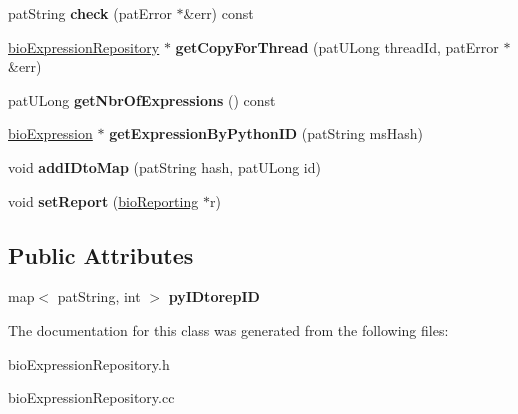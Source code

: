 \begin{DoxyCompactItemize}
\mbox{\label{classbio_expression_repository_a1c42b3fede9b8a0060b8f7e69d34237e}} 
pat\+String {\bfseries check} (pat\+Error $\ast$\&err) const
\item 
\mbox{\label{classbio_expression_repository_aeb8fb9e00af8900243d1b8024b8917ee}} 
\hyperlink{classbio_expression_repository}{bio\+Expression\+Repository} $\ast$ {\bfseries get\+Copy\+For\+Thread} (pat\+U\+Long thread\+Id, pat\+Error $\ast$\&err)
\item 
\mbox{\label{classbio_expression_repository_ae1739e45cec8eb48825e8cea42edcb83}} 
pat\+U\+Long {\bfseries get\+Nbr\+Of\+Expressions} () const
\item 
\mbox{\label{classbio_expression_repository_a857fe180f7655b1a872dab14ff0cf37c}} 
\hyperlink{classbio_expression}{bio\+Expression} $\ast$ {\bfseries get\+Expression\+By\+Python\+ID} (pat\+String ms\+Hash)
\item 
\mbox{\label{classbio_expression_repository_a4281f026125954231724c289e387d725}} 
void {\bfseries add\+I\+Dto\+Map} (pat\+String hash, pat\+U\+Long id)
\item 
\mbox{\label{classbio_expression_repository_a0bdf21c8462e0a24db625149e57dc323}} 
void {\bfseries set\+Report} (\hyperlink{classbio_reporting}{bio\+Reporting} $\ast$r)
\end{DoxyCompactItemize}
\subsection*{Public Attributes}
\begin{DoxyCompactItemize}
\item 
\mbox{\label{classbio_expression_repository_a8cdbf5267f566db1ee5ba8a065f236cd}} 
map$<$ pat\+String, int $>$ {\bfseries py\+I\+Dtorep\+ID}
\end{DoxyCompactItemize}


The documentation for this class was generated from the following files\+:\begin{DoxyCompactItemize}
\item 
bio\+Expression\+Repository.\+h\item 
bio\+Expression\+Repository.\+cc\end{DoxyCompactItemize}

